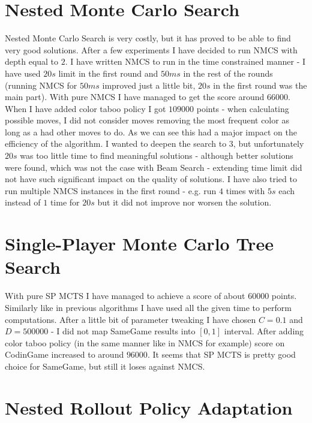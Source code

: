 \documentclass[11pt]{article}
\begin{document}
	\section{Nested Monte Carlo Search}
	Nested Monte Carlo Search is very costly, but it has proved to be able to find very good solutions. After a few experiments I have decided to run NMCS with depth equal to $2$. I have written NMCS to run in the time constrained manner - I have used $20s$ limit in the first round and $50ms$ in the rest of the rounds (running NMCS for $50ms$ improved just a little bit, $20s$ in the first round was the main part). With pure NMCS I have managed to get the score around $66000$. When I have added color taboo policy I got $109000$ points - when calculating possible moves, I did not consider moves removing the most frequent color as long as a had other moves to do. As we can see this had a major impact on the efficiency of the algorithm. I wanted to deepen the search to $3$, but unfortunately $20s$ was too little time to find meaningful solutions - although better solutions were found, which was not the case with Beam Search - extending time limit did not have such significant impact on the quality of solutions. I have also tried to run multiple NMCS instances in the first round - e.g. run $4$ times with $5s$ each instead of $1$ time for $20s$ but it did not improve nor worsen the solution.
	
	\section{Single-Player Monte Carlo Tree Search}
	With pure SP MCTS I have managed to achieve a score of about $60000$ points. Similarly like in previous algorithms I have used all the given time to perform computations. After a little bit of parameter tweaking I have chosen $C=0.1$ and $D=500000$ - I did not map SameGame results into $[0,1]$ interval. After adding color taboo policy (in the same manner like in NMCS for example) score on CodinGame increased to around $96000$. It seems that SP MCTS is pretty good choice for SameGame, but still it loses against NMCS.
	
	\section{Nested Rollout Policy Adaptation}
	
\end{document}
